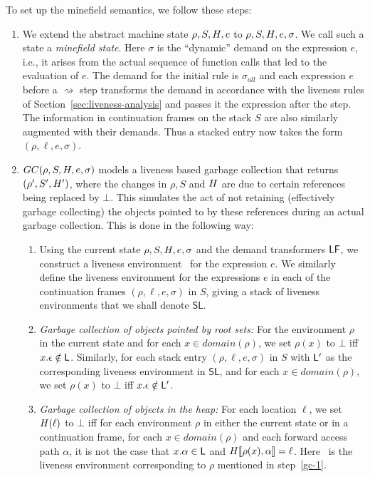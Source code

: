 \documentclass[preprint, 9pt]{sigplanconf}
\newcommand{\stk}{{S}}
\begin{document}
To set up the minefield semantics, we follow these steps:
\begin{enumerate}

\item  We  extend  the  abstract  machine  state  $\rho,S,H,e$  to
  $\rho,S,H,e,\sigma$.   We call  such a  state a  \emph{minefield
  state}.  Here $\sigma$  is the ``dynamic'' demand  on the expression
  $e$, i.e., it arises from the actual sequence of function calls that
  led  to the  evaluation  of $e$. The demand for the initial rule is  $\sigma_{all}$ and each expression $e$ before a $\rightsquigarrow$ step transforms the demand in accordance with the liveness rules of Section~\ref{sec:liveness-analysis} and passes it the expression after the step.  The  information in  continuation
  frames  on the  stack $S$  are also  similarly augmented  with their
  demands.  Thus a  stacked entry now takes the form  $(\rho, \ell, e,
  \sigma)$.
\item  $GC(\rho,  S,  H,  e, \sigma)$ models  a  liveness  based  garbage
  collection that returns $(\rho', S', H')$, where the changes in
  $\rho, S$ and  $H$ are due
  to certain references being replaced by $\bot$.  This simulates the
  act of  not retaining  (effectively garbage collecting)  the objects
  pointed to by these references  during an actual garbage collection.
  This is done in the following way:
  \begin{enumerate} 
  \item  \label{gc-1}Using the  current state  $\rho, \stk,  \heap, e,
    \sigma$  and the  demand  transformers $\mathsf{LF}$,  we construct  a
    liveness environment  \Lv\ for  the expression $e$.   We similarly
    define the liveness environment for the expressions $e$ in each of
    the  continuation frames $(\rho,  \ell, e,  \sigma)$ in
    $S$, giving a stack of  liveness environments that we shall denote
    $\mathsf{SL}$.
  \item \emph{Garbage collection of objects pointed by root sets:} For
    the environment $\rho$ in the current state and for each $x \in
    domain(\rho)$, we  set $\rho(x)$ to $\bot$  iff $x.\epsilon \notin
    \mathsf{L}$.  Similarly,  for each  stack entry $(\rho,\ell,e,\sigma)$
    in $S$ 
    with  $\mathsf{L}'$   as  the   corresponding  liveness   environment  in
    $\mathsf{SL}$, and for each $x \in domain(\rho)$, we set $\rho(x)$
    to $\bot$ iff $x.\epsilon \notin \mathsf{L}'$.
  \item \emph{Garbage  collection of  objects in  the heap:}  For each
    location $\ell$,  we set $H(\ell)$  to $\bot$ iff for each
    environment $\rho$ in either  the  current state or in a
    continuation frame, for each $x \in domain(\rho)$ and each forward
    access
    path $\alpha$, it is not the case that $x.\alpha \in \mathsf{L}$ and $H\llbracket\rho(x), \alpha
    \rrbracket = \ell$. Here 
\Lv\ is the liveness environment  corresponding to $\rho$ mentioned in
step~\ref{gc-1}.
  \end{enumerate}
\end{enumerate}
\end{document}
